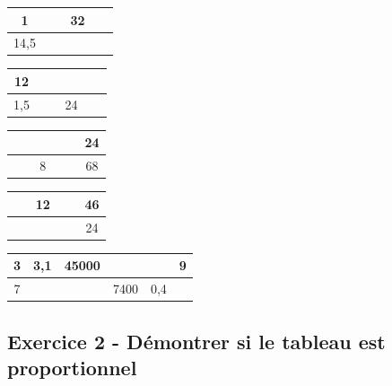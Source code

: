 \begin{multicols}{4}\noindent
  \begin{center}
    \begin{tabular}{|c|c|}
      \hline
      1 & 32\\  \hline
      14,5 & $\phantom{azertyuiop}$\\  \hline
    \end{tabular}
  \end{center}
  \Pointilles[2]
  \begin{center}
    \begin{tabular}{|c|c|}
      \hline
      12 & $\phantom{azertyuiop}$\\  \hline
      1,5 & 24\\  \hline
    \end{tabular}
  \end{center}
  \Pointilles[2]
  \begin{center}
    \begin{tabular}{|c|c|}
      \hline
      $\phantom{azertyuiop}$  & 24\\  \hline
      8 & 68\\  \hline
    \end{tabular}
  \end{center}
  \Pointilles[2]
  \begin{center}
    \begin{tabular}{|c|c|}
      \hline
      12 & 46\\  \hline
      $\phantom{azertyuiop}$ & 24\\  \hline
    \end{tabular}
  \end{center}
  \Pointilles[2]
\end{multicols}

\begin{center}
  \begin{tabular}{|c|c|c|c|c|c|}
    \hline
   3 &  3,1                   &                  45000 &  \phantom{100 000 000} &  \phantom{100 000 000} &                     9\\ \hline
   7 &  \phantom{100 000 000} &  \phantom{100 000 000} &                   7400 &                    0,4 &  \phantom{100 000 000}\\ \hline     
  \end{tabular}
\end{center}
\Pointilles[4]


\subsection*{Exercice 2 - Démontrer si le tableau est proportionnel}

